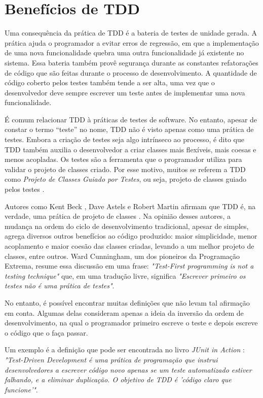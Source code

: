 \section{Benefícios de TDD}

Uma consequência da prática de TDD é a bateria de testes de unidade gerada.
A prática ajuda o programador a evitar erros de regressão, em que a implementação de
uma nova funcionalidade quebra uma outra funcionalidade já existente no sistema.
Essa bateria também provê segurança durante as
constantes refatorações de código que são feitas durante o processo de
desenvolvimento.
A quantidade de código coberto pelos testes também tende a ser alta, uma vez que o
desenvolvedor deve sempre escrever um teste antes de implementar uma nova
funcionalidade. 

É comum relacionar TDD à práticas de testes de software. No entanto, apesar de constar o
termo ``teste'' no nome, TDD não é visto apenas como uma prática de testes.
Embora a criação de testes seja algo intrínseco ao processo, é dito que TDD também 
auxilia o desenvolvedor a criar classes mais flexíveis, mais coesas e
menos acopladas. Os testes são a ferramenta que o programador utiliza para
validar o projeto de classes criado. Por esse motivo, muitos se referem a TDD como
\textit{Projeto de Classes Guiado por Testes}, ou seja, projeto de classes guiado pelos testes
\cite{tdd-taxonomy}.

Autores como Kent Beck \cite{aim-fire}, Dave Astels \cite{astels-tdd} e
Robert Martin \cite{bob-martin} afirmam que TDD é, na verdade, uma prática de
projeto de classes \cite{tdd-taxonomy} \cite{aim-fire}.
Na opinião desses autores, a mudança na ordem do ciclo de
desenvolvimento tradicional, apesar de simples, agrega diversos outros
benefícios ao código produzido: maior simplicidade, menor acoplamento e maior
coesão das classes criadas, levando a um melhor projeto de classes, entre
outros. Ward Cunningham, um dos pioneiros da Programação Extrema, resume essa 
discussão em uma frase: \textit{"Test-First programming is not a testing technique"} 
que, em uma tradução livre, significa \textit{"Escrever primeiro os testes
não é uma prática de testes"}.

No entanto, é possível encontrar muitas definições que
não levam tal afirmação em conta. Algumas delas consideram apenas a ideia da
inversão da ordem de desenvolvimento, na qual o programador primeiro
escreve o teste e depois escreve o código que o faça passar.

Um exemplo é a definição que pode ser encontrada no livro \textit{JUnit
in Action} \cite{junit-in-action}: \textit{"Test-Driven Development é uma
prática de programação que instrui desenvolvedores a escrever código novo
apenas se um teste automatizado estiver falhando, e a eliminar duplicação. O
objetivo de TDD é 'código claro que funcione'"}.

